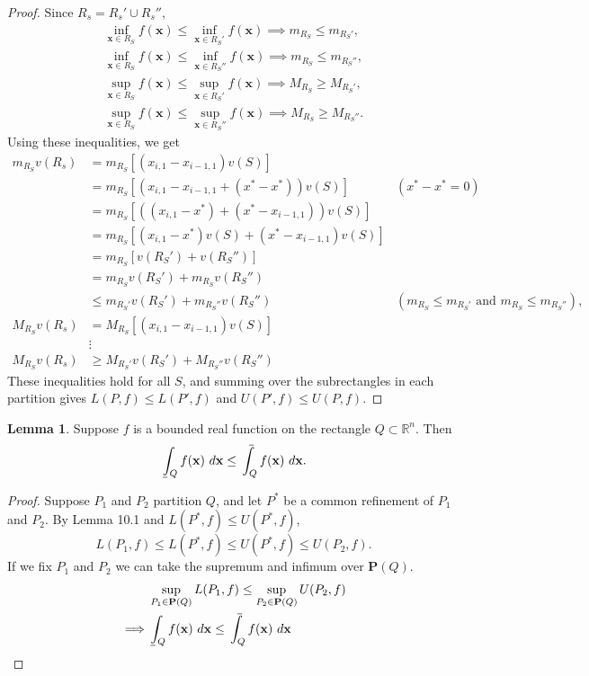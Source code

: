 \documentclass{article}
\def\upint{\mathchoice%
	{\mkern13mu\overline{\vphantom{\intop}\mkern7mu}\mkern-20mu}%
	{\mkern7mu\overline{\vphantom{\intop}\mkern7mu}\mkern-14mu}%
	{\mkern7mu\overline{\vphantom{\intop}\mkern7mu}\mkern-14mu}%
	{\mkern7mu\overline{\vphantom{\intop}\mkern7mu}\mkern-14mu}%
	\int}
\def\lowint{\mkern3mu\underline{\vphantom{\intop}\mkern7mu}\mkern-10mu\int}
\newcommand{\R}{\mathbb{R}}
\newcommand{\x}{\mathbf{x}}
\theoremstyle{definition}
\newtheorem{lemma}{Lemma}[section]
\begin{document}
\begin{proof}
		Since $ R_s = R_s'\cup R_s'' $, 
		\begin{align*}
			\inf_{\x\in R_S}f(\x) \le \inf_{\x\in R_S'}f(\x) \implies m_{R_S} \le m_{R_S'} ,\\
			\inf_{\x\in R_S}f(\x) \le \inf_{\x\in R_S''}f(\x) \implies m_{R_S} \le m_{R_S''},\\
				\sup_{\x\in R_S}f(\x) \le \sup_{\x\in R_S'}f(\x) \implies M_{R_S} \ge M_{R_S'},\\
				\sup_{\x\in R_S}f(\x) \le \sup_{\x\in R_S''}f(\x) \implies M_{R_S} \ge M_{R_S''}.
		\end{align*}
		Using these inequalities, we get 
		\begin{align*}
			m_{R_S}v(R_s)&=m_{R_S}\left[(x_{i,1}-x_{i-1,1})v(S)\right]\\ 
			&=m_{R_S}\left[(x_{i,1}-x_{i-1,1} + (x^*-x^*) )v(S)\right] & (x^*-x^* = 0)\\
			&=m_{R_S}\left[((x_{i,1}-x^*) + (x^*-x_{i-1,1})) v(S)\right] \\
			& = m_{R_S}\left[(x_{i,1}-x^*)v(S) +  (x^*-x_{i-1,1})v(S)\right] \\
			& = m_{R_S}\left[v(R_S') + v(R_S'')\right]\\ 
			& = m_{R_S}v(R_S') + m_{R_S}v(R_S'')\\
			& \le  m_{R_S'}v(R_S') + m_{R_S''}v(R_S'') & (m_{R_S} \le m_{R_S'}\text{ and } m_{R_S} \le m_{R_S''}), \\
			M_{R_S}v(R_s)&=M_{R_S}\left[(x_{i,1}-x_{i-1,1})v(S)\right]\\ 
			&\vdots \\
			M_{R_S}v(R_s) & \ge M_{R_S'}v(R_S') + M_{R_S''}v(R_S'')
		\end{align*}
		These inequalities hold for all $ S $, and summing over the subrectangles in each partition gives $ L(P,f)\le L(P',f) $ and $ U(P',f)\le U(P,f) $.
		\end{proof}
	\begin{lemma}
		Suppose $ f $ is a bounded real function on the rectangle $ Q\subset \R^n $. Then $$ \lowint_Q f(\x)\ d\x \le	\upint_Q f(\x)\ d\x .$$ 
	\end{lemma}
	\begin{proof}
		Suppose $ P_1 $ and $ P_2 $ partition $ Q $, and let $ P^* $ be a common refinement of $ P_1 $ and $ P_2 $. By Lemma 10.1 and $ L(P^*,f)\le U(P^*,f) $,
		$$ L(P_1,f)\le L(P^*,f)\le U(P^*,f)\le U(P_2,f).$$
		If we fix $ P_1 $ and $ P_2 $ we can take the supremum and infimum over $ \mathbf P(Q) $. 
		\begin{align*}
			&\sup_{P_1\in \textbf{P}(Q)}L(P_1,f) \le \sup_{P_2\in \textbf{P}(Q)}U(P_2,f)\\\implies &  \lowint_Q f(\x)\ d\x \le	\upint_Q f(\x)\ d\x 
		\end{align*}
	\end{proof}
\end{document}
